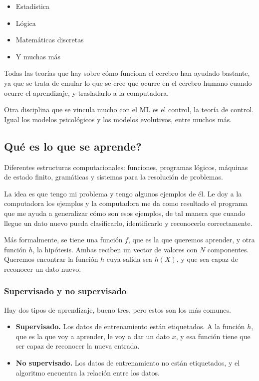 \documentclass[11pt,letterpaper]{article}
\begin{document}
\begin{itemize}[itemsep=0.1em]
    \item Estadística
    \item Lógica
    \item Matemáticas discretas
    \item Y muchas más
\end{itemize}

Todas las teorías que hay sobre cómo funciona el cerebro han ayudado
bastante, ya que se trata de emular lo que se cree que ocurre en el
cerebro humano cuando ocurre el aprendizaje, y trasladarlo a la
computadora.

Otra disciplina que se vincula mucho con el ML es el control, la
teoría de control. Igual los modelos psicológicos y los modelos
evolutivos, entre muchos más.


\subsection*{Qué es lo que se aprende?}

Diferentes estructuras computacionales: funciones, programas lógicos,
máquinas de estado finito, gramáticas y sistemas para la resolución de
problemas.

La idea es que tengo mi problema y tengo algunos ejemplos de él. Le
doy a la computadora los ejemplos y la computadora me da como
resultado el programa que me ayuda a generalizar cómo son esos
ejemplos, de tal manera que cuando llegue un dato nuevo pueda
clasificarlo, identificarlo y reconocerlo correctamente.

Más formalmente, se tiene una función $f$, que es la que queremos
aprender, y otra función $h$, la hipótesis. Ambas reciben un vector de
valores con $N$ componentes. Queremos encontrar la función $h$ cuya
salida sea $h(X)$, y que sea capaz de reconocer un dato nuevo.

\subsubsection*{Supervisado y no supervisado}

Hay dos tipos de aprendizaje, bueno tres, pero estos son los más
comunes.

\begin{itemize}[itemsep=0.3em]
    \item \textbf{Supervisado.} Los datos de entrenamiento están
          etiquetados. A la función $h$, que es la que voy a aprender,
          le voy a dar un dato $x$, y esa función tiene que ser capaz
          de reconocer la nueva entrada.
    \item \textbf{No supervisado.} Los datos de entrenamiento no están
          etiquetados, y el algoritmo encuentra la relación entre los
          datos.
\end{itemize}
\end{document}
